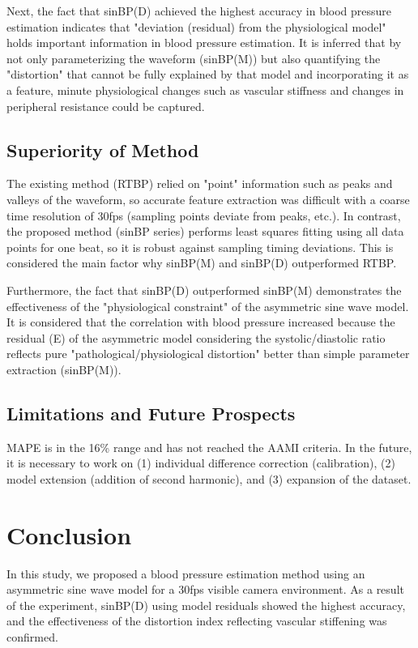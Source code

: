 \documentclass[fleqn,10pt,twocolumn]{AROB}
\begin{document}
Next, the fact that sinBP(D) achieved the highest accuracy in blood pressure estimation indicates that "deviation (residual) from the physiological model" holds important information in blood pressure estimation. It is inferred that by not only parameterizing the waveform (sinBP(M)) but also quantifying the "distortion" that cannot be fully explained by that model and incorporating it as a feature, minute physiological changes such as vascular stiffness and changes in peripheral resistance could be captured.

\subsection{Superiority of Method}

The existing method (RTBP) relied on "point" information such as peaks and valleys of the waveform, so accurate feature extraction was difficult with a coarse time resolution of 30fps (sampling points deviate from peaks, etc.). In contrast, the proposed method (sinBP series) performs least squares fitting using all data points for one beat, so it is robust against sampling timing deviations. This is considered the main factor why sinBP(M) and sinBP(D) outperformed RTBP.

Furthermore, the fact that sinBP(D) outperformed sinBP(M) demonstrates the effectiveness of the "physiological constraint" of the asymmetric sine wave model. It is considered that the correlation with blood pressure increased because the residual (E) of the asymmetric model considering the systolic/diastolic ratio reflects pure "pathological/physiological distortion" better than simple parameter extraction (sinBP(M)).

\subsection{Limitations and Future Prospects}
MAPE is in the 16\% range and has not reached the AAMI criteria. In the future, it is necessary to work on (1) individual difference correction (calibration), (2) model extension (addition of second harmonic), and (3) expansion of the dataset.

\section{Conclusion}
In this study, we proposed a blood pressure estimation method using an asymmetric sine wave model for a 30fps visible camera environment. As a result of the experiment, sinBP(D) using model residuals showed the highest accuracy, and the effectiveness of the distortion index reflecting vascular stiffening was confirmed.
\end{document}
